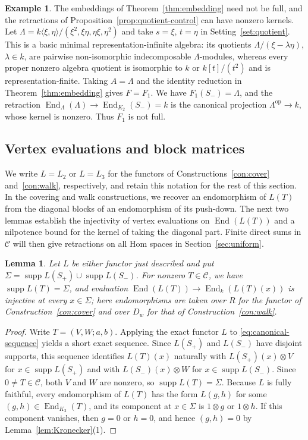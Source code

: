 \documentclass[a4paper,reqno,10pt]{amsart}
\newtheorem{lemma}[theorem]{Lemma}
\theoremstyle{definition}
\newtheorem{example}[theorem]{Example}
\DeclareMathOperator{\End}{End}
\DeclareMathOperator{\supp}{supp}
\newcommand{\C}{\mathcal C}
\numberwithin{equation}{section}
\begin{document}
\begin{example}\label{ex:not-full}
The embeddings of Theorem~\ref{thm:embedding} need not be full, and the
retractions of Proposition~\ref{prop:quotient-control} can have nonzero
kernels. Let
$\Lambda=k\langle \xi,\eta\rangle/(\xi^2,\xi\eta,\eta\xi,\eta^2)$
and take $s=\xi$, $t=\eta$ in Setting~\ref{set:quotient}.
This is a basic minimal representation-infinite algebra: its quotients
$\Lambda/(\xi-\lambda\eta)$, $\lambda\in k$, are pairwise non-isomorphic
indecomposable $\Lambda$-modules, whereas every proper nonzero algebra
quotient is isomorphic to $k$ or $k[t]/(t^2)$ and is representation-finite.
Taking $A=\Lambda$ and the identity reduction in Theorem~\ref{thm:embedding}
gives $F=F_1$. We have $F_1(S_-)=\Lambda$, and the retraction
$\End_\Lambda(\Lambda)\to\End_{K_2}(S_-)=k$ is the canonical projection
$\Lambda^{\mathrm{op}}\to k$, whose kernel is nonzero. Thus $F_1$ is not full.
\end{example}

\subsection{Vertex evaluations and block matrices}
We write $L=L_2$ or $L=L_3$ for the functors of
Constructions~\ref{con:cover} and~\ref{con:walk}, respectively, and
retain this notation for the rest of this section.
In the covering and walk constructions, we recover an endomorphism of $L(T)$ from the diagonal blocks of
an endomorphism of its push-down. The next two lemmas establish the
injectivity of vertex evaluations on $\End(L(T))$ and a nilpotence bound for the kernel
of taking the diagonal part. Finite direct sums in $\C$ will then give
retractions on all Hom spaces in Section~\ref{sec:uniform}.

\begin{lemma}\label{lem:vertex-evaluations}
Let $L$ be either functor just described and put
$\Sigma=\supp L(S_+)\cup\supp L(S_-)$. For nonzero $T\in\C$,
we have $\supp L(T)=\Sigma$, and evaluation
$\End(L(T))\to\End_k(L(T)(x))$ is injective at every $x\in\Sigma$;
here endomorphisms are taken over $R$ for the functor of
Construction~\ref{con:cover} and over $D_w$ for that of
Construction~\ref{con:walk}.
\end{lemma}
\begin{proof}
Write $T=(V,W;a,b)$. Applying the exact functor $L$ to
\eqref{eq:canonical-sequence} yields a short exact sequence. Since $L(S_+)$ and $L(S_-)$ have disjoint
supports, this sequence identifies $L(T)(x)$ naturally with $L(S_+)(x)\otimes V$ for
$x\in\supp L(S_+)$ and with $L(S_-)(x)\otimes W$ for $x\in\supp L(S_-)$.
Since $0\ne T\in\C$, both $V$ and $W$ are nonzero, so $\supp L(T)=\Sigma$.
Because $L$ is fully faithful, every endomorphism of $L(T)$ has the form $L(g,h)$ for some $(g,h)\in\End_{K_2}(T)$, and its component at $x\in\Sigma$
is $1\otimes g$ or $1\otimes h$. If this component vanishes, then $g=0$ or $h=0$,
and hence $(g,h)=0$ by Lemma~\ref{lem:Kronecker}(1).
\end{proof}
\end{document}

